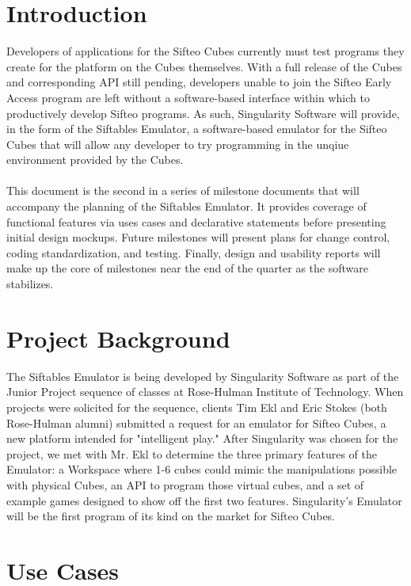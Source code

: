 \documentclass[12pt]{article}
\begin{document}
\section{Introduction}
Developers of applications for the \gls{Sifteo Cubes} currently must test programs they create for the platform on the Cubes themselves.  With a full release of the Cubes and corresponding \gls{API} still pending, developers unable to join the Sifteo Early Access program are left without a software-based interface within which to productively develop Sifteo programs. As such, Singularity Software will provide, in the form of the Siftables Emulator, a software-based emulator for the Sifteo Cubes that will allow any developer to try programming in the unqiue environment provided by the Cubes.\\\\
This document is the second in a series of milestone documents that will accompany the planning of the Siftables Emulator. It provides coverage of functional features via uses cases and declarative statements before presenting initial design mockups. Future milestones will present plans for change control, coding standardization, and testing. Finally, design and usability reports will make up the core of milestones near the end of the quarter as the software stabilizes.

\section{Project Background}
The Siftables Emulator is being developed by Singularity Software as part of the Junior Project sequence of classes at Rose-Hulman Institute of Technology. When projects were solicited for the sequence, clients Tim Ekl and Eric Stokes (both Rose-Hulman alumni) submitted a request for an emulator for Sifteo Cubes, a new platform intended for "intelligent play." After Singularity was chosen for the project, we met with Mr. Ekl to determine the three primary features of the Emulator: a Workspace where 1-6 cubes could mimic the manipulations possible with physical Cubes, an API to program those virtual cubes, and a set of example games designed to show off the first two features. Singularity's Emulator will be the first program of its kind on the market for Sifteo Cubes.

\clearpage

\section{Use Cases}
\end{document}
